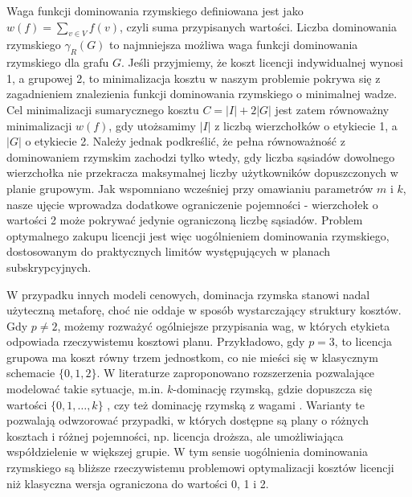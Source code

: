 Waga funkcji dominowania rzymskiego definiowana jest jako $w(f) = \sum_{v \in V} f(v)$, czyli suma przypisanych wartości. Liczba dominowania rzymskiego $\gamma_R(G)$ to najmniejsza możliwa waga funkcji dominowania rzymskiego dla grafu $G$. Jeśli przyjmiemy, że koszt licencji indywidualnej wynosi 1, a grupowej 2, to minimalizacja kosztu w naszym problemie pokrywa się z zagadnieniem znalezienia funkcji dominowania rzymskiego o minimalnej wadze. Cel minimalizacji sumarycznego kosztu $C = |I| + 2|G|$ jest zatem równoważny minimalizacji $w(f)$, gdy utożsamimy $|I|$ z liczbą wierzchołków o etykiecie 1, a $|G|$ o etykiecie 2. Należy jednak podkreślić, że pełna równoważność z dominowaniem rzymskim zachodzi tylko wtedy, gdy liczba sąsiadów dowolnego wierzchołka nie przekracza maksymalnej liczby użytkowników dopuszczonych w planie grupowym. Jak wspomniano wcześniej przy omawianiu parametrów $m$ i $k$, nasze ujęcie wprowadza dodatkowe ograniczenie pojemności - wierzchołek o wartości 2 może pokrywać jedynie ograniczoną liczbę sąsiadów. Problem optymalnego zakupu licencji jest więc uogólnieniem dominowania rzymskiego, dostosowanym do praktycznych limitów występujących w planach subskrypcyjnych.


W przypadku innych modeli cenowych, dominacja rzymska stanowi nadal użyteczną metaforę, choć nie oddaje w sposób wystarczający struktury kosztów. Gdy $p \neq 2$, możemy rozważyć ogólniejsze przypisania wag, w których etykieta odpowiada rzeczywistemu kosztowi planu. Przykładowo, gdy $p=3$, to licencja grupowa ma koszt równy trzem jednostkom, co nie mieści się w klasycznym schemacie $\{0,1,2\}$. W literaturze zaproponowano rozszerzenia pozwalające modelować takie sytuacje, m.in. $k$-dominację rzymską, gdzie dopuszcza się wartości $\{0,1,\dots,k\}$ \cite{CHAUDHARY2024301}, czy też dominację rzymską z wagami \cite{Ghaffari2020}. Warianty te pozwalają odwzorować przypadki, w których dostępne są plany o różnych kosztach i różnej pojemności, np. licencja droższa, ale umożliwiająca współdzielenie w większej grupie. W tym sensie uogólnienia dominowania rzymskiego są bliższe rzeczywistemu problemowi optymalizacji kosztów licencji niż klasyczna wersja ograniczona do wartości 0, 1 i 2.

